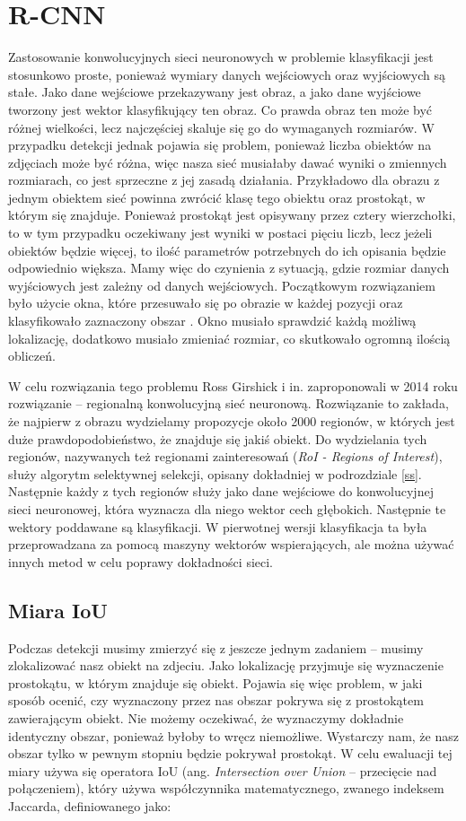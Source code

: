 \documentclass[a4paper,twoside,12pt]{book}
\newcommand{\obcy}[1]{\emph{#1}}
\newcommand{\ang}[1]{{\selectlanguage{british}\obcy{#1}}}
\begin{document}
{\section{R-CNN}
\label{rcnn}
{Zastosowanie konwolucyjnych sieci neuronowych w problemie klasyfikacji jest stosunkowo proste, ponieważ wymiary danych wejściowych oraz wyjściowych są stałe. Jako dane wejściowe przekazywany jest obraz, a jako dane wyjściowe tworzony jest wektor klasyfikujący ten obraz. Co prawda obraz ten może być różnej wielkości, lecz najczęściej skaluje się go do wymaganych rozmiarów. W przypadku detekcji jednak pojawia się problem, ponieważ liczba obiektów na zdjęciach może być różna, więc nasza sieć musiałaby dawać wyniki o zmiennych rozmiarach, co jest sprzeczne z jej zasadą działania. Przykładowo dla obrazu z jednym obiektem sieć powinna zwrócić klasę tego obiektu oraz prostokąt, w którym się znajduje. Ponieważ prostokąt jest opisywany przez cztery wierzchołki, to w tym przypadku oczekiwany jest wyniki w postaci pięciu liczb, lecz jeżeli obiektów będzie więcej, to ilość parametrów potrzebnych do ich opisania będzie odpowiednio większa. Mamy więc do czynienia z sytuacją, gdzie rozmiar danych wyjściowych jest zależny od danych wejściowych. Początkowym rozwiązaniem było użycie okna, które przesuwało się po obrazie w każdej pozycji oraz klasyfikowało zaznaczony obszar \cite{szegedy2013deep}. Okno musiało sprawdzić każdą możliwą lokalizację, dodatkowo musiało zmieniać rozmiar, co skutkowało ogromną ilością obliczeń.}

{W celu rozwiązania tego problemu Ross Girshick i in. zaproponowali w 2014 roku rozwiązanie – regionalną konwolucyjną sieć neuronową\cite{girshick2014rich}. Rozwiązanie to zakłada, że najpierw z obrazu wydzielamy propozycje około 2000 regionów, w których jest duże prawdopodobieństwo, że znajduje się jakiś obiekt. Do wydzielania tych regionów, nazywanych też regionami zainteresowań (\ang {RoI - Regions of Interest}), służy algorytm selektywnej selekcji, opisany dokładniej w podrozdziale \ref{ss}. Następnie każdy z tych regionów służy jako dane wejściowe do konwolucyjnej sieci neuronowej, która wyznacza dla niego wektor cech głębokich. Następnie te wektory poddawane są klasyfikacji. W pierwotnej wersji klasyfikacja ta była przeprowadzana za pomocą maszyny wektorów wspierających, ale można używać innych metod w celu poprawy dokładności sieci.}
\subsection{Miara IoU}
\label{iou}
{Podczas detekcji musimy zmierzyć się z jeszcze jednym zadaniem – musimy zlokalizować nasz obiekt na zdjeciu. Jako lokalizację przyjmuje się wyznaczenie prostokątu, w którym znajduje się obiekt. Pojawia się więc problem, w jaki sposób ocenić, czy wyznaczony przez nas obszar pokrywa się z prostokątem zawierającym obiekt. Nie możemy oczekiwać, że wyznaczymy dokładnie identyczny obszar, ponieważ byłoby to wręcz niemożliwe. Wystarczy nam, że nasz obszar tylko w pewnym stopniu będzie pokrywał prostokąt. W celu ewaluacji tej miary używa się operatora IoU (ang. \ang{Intersection over Union} – przecięcie nad połączeniem), który używa współczynnika matematycznego, zwanego indeksem Jaccarda, definiowanego jako: 

}}
\end{document}
